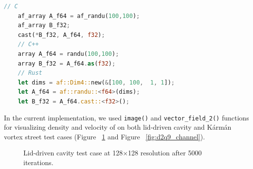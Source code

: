 \begin{lstlisting}[language=Rust, caption={Converting to single precision floating point for Forge visualization in C, C++ and Rust}, label=forge-cast-f32]
	// C
	af_array A_f64 = af_randu(100,100);
	af_array B_f32;
	cast(*B_f32, A_f64, f32);
	// C++
	array A_f64 = randu(100,100);
	array B_f32 = A_f64.as(f32);
	// Rust
	let dims = af::Dim4::new(&[100, 100,  1, 1]);
	let A_f64 = af::randu::<f64>(dims);
	let B_f32 = A_f64.cast::<f32>();
\end{lstlisting}

In the current implementation, we used \texttt{image()} and \texttt{vector_field_2()} functions for visualizing density and velocity of on both lid-driven cavity and Kármán vortex street test cases (Figure~ \ref{fig:d2q9_lid} and Figure~ \ref{fig:d2q9_channel}).

\begin{figure}[!ht]
	\centering
	\qquad
	\captionsetup{justification=centering}
	\caption{Lid-driven cavity test case at 128$\times$128 resolution after 5000 iterations.}
	\label{fig:d2q9_lid}
\end{figure}


